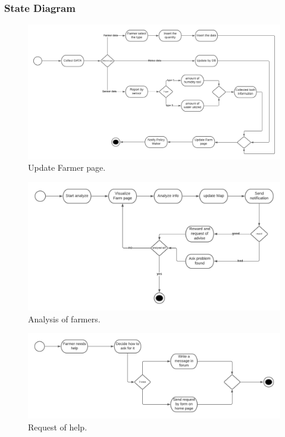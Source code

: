 \documentclass{article}
\begin{document}
\subsubsection{State Diagram}
\begin{figure}[H]
    \begin{center}
    \includegraphics[width=1\textwidth]{images/State chart 1.png}
    \caption{Update Farmer page.}
    \label{fig:dataaugmentation}
    \end{center}
\end{figure}
\begin{figure}[H]
    \begin{center}
    \includegraphics[width=1\textwidth]{images/State chart 2.png}
    \caption{Analysis of farmers.}
    \label{fig:dataaugmentation}
    \end{center}
\end{figure}
\begin{figure}[H]
    \begin{center}
    \includegraphics[width=1\textwidth]{images/State chart 3.png}
    \caption{Request of help.}
    \label{fig:dataaugmentation}
    \end{center}
\end{figure}
\newpage
\end{document}
